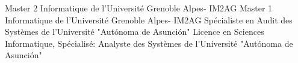 %
%
%


\begin{scholarship}
					{Master 2 Informatique de l'Université Grenoble Alpes- IM2AG}
					{Master 1 Informatique de l'Université Grenoble Alpes- IM2AG }
					{Spécialiste en Audit des Systèmes de l'Université "Autónoma de Asunción"}
					{Licence en Sciences Informatique, Spécialisé: Analyste des Systèmes de l'Université "Autónoma de Asunción"}
\end{scholarship}